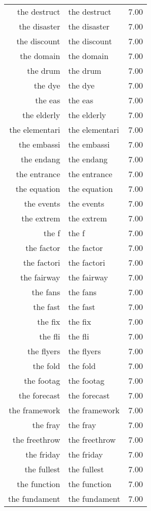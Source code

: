 \begin{table}[ht]
\begin{tabular}{rlr}
  the destruct & the destruct & 7.00 \\ 
  the disaster & the disaster & 7.00 \\ 
  the discount & the discount & 7.00 \\ 
  the domain & the domain & 7.00 \\ 
  the drum & the drum & 7.00 \\ 
  the dye & the dye & 7.00 \\ 
  the eas & the eas & 7.00 \\ 
  the elderly & the elderly & 7.00 \\ 
  the elementari & the elementari & 7.00 \\ 
  the embassi & the embassi & 7.00 \\ 
  the endang & the endang & 7.00 \\ 
  the entrance & the entrance & 7.00 \\ 
  the equation & the equation & 7.00 \\ 
  the events & the events & 7.00 \\ 
  the extrem & the extrem & 7.00 \\ 
  the f & the f & 7.00 \\ 
  the factor & the factor & 7.00 \\ 
  the factori & the factori & 7.00 \\ 
  the fairway & the fairway & 7.00 \\ 
  the fans & the fans & 7.00 \\ 
  the fast & the fast & 7.00 \\ 
  the fix & the fix & 7.00 \\ 
  the fli & the fli & 7.00 \\ 
  the flyers & the flyers & 7.00 \\ 
  the fold & the fold & 7.00 \\ 
  the footag & the footag & 7.00 \\ 
  the forecast & the forecast & 7.00 \\ 
  the framework & the framework & 7.00 \\ 
  the fray & the fray & 7.00 \\ 
  the freethrow & the freethrow & 7.00 \\ 
  the friday & the friday & 7.00 \\ 
  the fullest & the fullest & 7.00 \\ 
  the function & the function & 7.00 \\ 
  the fundament & the fundament & 7.00 \\ 

\end{tabular}
\end{table}
